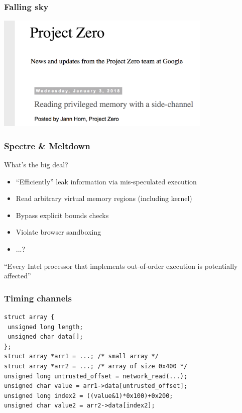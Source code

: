 \documentclass[10pt]{beamer}
\begin{document}
\begin{frame}

\frametitle{Falling sky}

\centering
\includegraphics[height=15em]{sidechan-blog.png}

\end{frame}


\begin{frame}

\frametitle{Spectre \& Meltdown}

What's the big deal? \pause
\begin{itemize}
\item ``Efficiently'' leak information via mis-speculated execution
\item Read arbitrary virtual memory regions (including kernel)
\item Bypass explicit bounds checks
\item Violate browser sandboxing
\item ...? \\[1em]
\end{itemize}

\pause
\begin{center}
``Every Intel processor that implements out-of-order execution is potentially affected''
\end{center}

\end{frame}


\begin{frame}[fragile]

\frametitle{Timing channels}

\begin{lstlisting}[basicstyle=\small,style=customjava]
struct array {
 unsigned long length;
 unsigned char data[];
};
struct array *arr1 = ...; /* small array */
struct array *arr2 = ...; /* array of size 0x400 */
unsigned long untrusted_offset = network_read(...);
unsigned char value = arr1->data[untrusted_offset];
unsigned long index2 = ((value&1)*0x100)+0x200;
unsigned char value2 = arr2->data[index2];
\end{lstlisting}

\end{frame}
\end{document}
